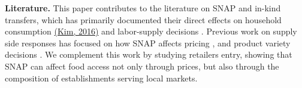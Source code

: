 \documentclass[12pt]{article}
\begin{document}






\textbf{Literature.} This paper contributes to  the literature on SNAP and in-kind transfers, which has primarily documented their direct effects on household consumption \citep{hoynes2009consumption,ratcliffe2011snap,hastings2018snap} \href{https://www.sciencedirect.com/science/article/abs/pii/S0306919216304341?casa_token=jSSQmsxwm5wAAAAA:Q-PJutPWl5QDGFEt5bL7mzpD7p7Rwy3h8-Y2Hrhh2rckXB728UVT7GnekD5tm5o-tlS9_ClgXQ}{(Kim, 2016)} and labor-supply decisions \citep{hoynes2012work,han2022impact,gray2023employed}. Previous work on supply side responses has focused on how SNAP affects pricing \citep{leung2023government}, and product variety decisions \citep{byrne2022welfare}. We complement this work by studying retailers entry, showing that SNAP can affect food access not only through prices, but also through the composition of establishments serving local markets.
\end{document}
